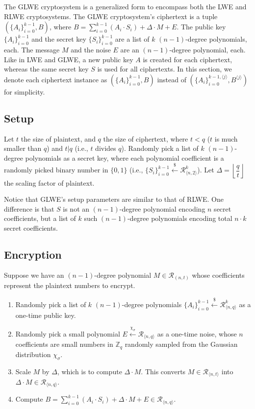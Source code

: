 The GLWE cryptosystem is a generalized form to encompass both the LWE and RLWE cryptosystems. The GLWE cryptosystem's ciphertext is a tuple $(\{A_i\}_{i=0}^{k-1}, B)$, where $B = \sum\limits_{i=0}^{k-1}{(A_i \cdot S_i)} + \Delta \cdot M + E$. The public key $\{A_i\}_{i=0}^{k-1}$ and the secret key $\{S_i\}_{i=0}^{k-1}$ are a list of $k$ $(n-1)$-degree polynomials, each. The message $M$ and the noise $E$ are an $(n-1)$-degree polynomial, each. Like in LWE and GLWE, a new public key $A$ is created for each ciphertext, whereas the same secret key $S$ is used for all ciphertexts. In this section, we denote each ciphertext instance as $(\{A_i\}_{i=0}^{k-1}, B)$ instead of $(\{A_i\}_{i=0}^{k-1, \langle j \rangle}, B^{\langle j \rangle})$ for simplicity.




\subsection{Setup}
Let $t$ the size of plaintext, and $q$ the size of ciphertext, where $t < q$ ($t$ is much smaller than $q$) and $t | q$ (i.e., $t$ divides $q$). Randomly pick a list of $k$ $(n-1)$-degree polynomials as a secret key, where each polynomial coefficient is a randomly picked binary number in $\{0, 1\}$ (i.e., $\{S_i\}_{i=0}^{k-1} \xleftarrow{\$} \mathcal{R}_{\langle n, 2 \rangle}^k$). Let $\Delta = \left\lfloor\dfrac{q}{t}\right\rfloor$ the scaling factor of plaintext.

Notice that GLWE's setup parameters are similar to that of RLWE. One difference is that $S$ is not an $(n-1)$-degree polynomial encoding $n$ secret coefficients, but a list of $k$ such $(n-1)$-degree polynomials encoding total $n \cdot k$ secret coefficients.


\subsection{Encryption}
\label{subsec:glwe-enc}

Suppose we have an $(n-1)$-degree polynomial $M \in \mathcal{R}_{(n, t)}$ whose coefficients represent the plaintext numbers to encrypt.


\begin{enumerate}
\item Randomly pick a list of $k$ $(n-1)$-degree polynomials $\{A_i\}_{i=0}^{k-1} \xleftarrow{\$} \mathcal{R}_{\langle n,q \rangle}^{k}$ as a one-time public key.
\item Randomly pick a small polynomial $E \xleftarrow{\chi_\sigma} \mathcal{R}_{\langle n,q \rangle}$ as a one-time noise, whose $n$ coefficients are small numbers in $\mathbb{Z}_q$ randomly sampled from the Gaussian distribution $\chi_\sigma$. 
\item Scale $M$ by $\Delta$, which is to compute $\Delta \cdot M$. This converts $M \in \mathcal{R}_{\langle n, t \rangle}$ into $\Delta \cdot M \in \mathcal{R}_{\langle n,q \rangle}$.
\item Compute $B = \sum\limits_{i=0}^{k-1}{(A_i \cdot S_i)} + \Delta \cdot M + E \in \mathcal{R}_{\langle n,q \rangle}$. 
\end{enumerate}

